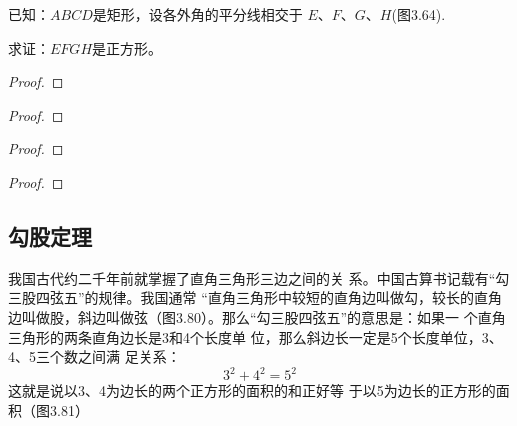 \begin{example}
    已知：$ABCD$是矩形，设各外角的平分线相交于
    $E$、$F$、$G$、$H$(图3.64). 

    求证：$EFGH$是正方形。
\end{example}
    
\begin{proof}
    







    
\end{proof}











\begin{solution}
    
\end{solution}





\begin{proof}
    
\end{proof}

\begin{proof}
    
\end{proof}

\begin{proof}
    
\end{proof}





\begin{blk}
    
\end{blk}

\begin{blk}
    
\end{blk}

\begin{blk}
    
\end{blk}

\begin{blk}
    
\end{blk}


\subsection{勾股定理}

我国古代约二千年前就掌握了直角三角形三边之间的关
系。中国古算书记载有“勾三股四弦五”的规律。我国通常
“直角三角形中较短的直角边叫做勾，较长的直角边叫做股，斜边叫做弦（图3.80）。那么“勾三股四弦五”的意思是：如果一
个直角三角形的两条直角边长是3和4个长度单
位，那么斜边长一定是5个长度单位，3、4、5三个数之间满
足关系：
\[3^2+4^2=5^2\]
这就是说以3、4为边长的两个正方形的面积的和正好等
于以5为边长的正方形的面积（图3.81）















